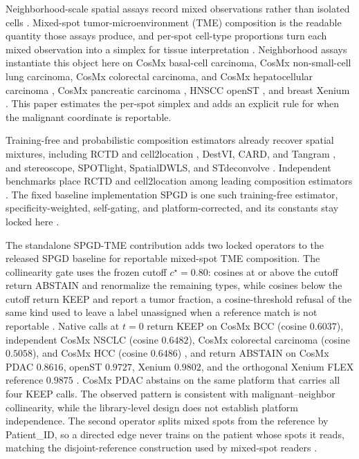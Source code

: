 Neighborhood-scale spatial assays record mixed observations rather than isolated cells \citep{Stahl2016,Moses2022,Rao2021}. Mixed-spot tumor-microenvironment (TME) composition is the readable quantity those assays produce, and per-spot cell-type proportions turn each mixed observation into a simplex for tissue interpretation \citep{Cable2022,Kleshchevnikov2022,Danaher2022,Miller2022,Newman2019,Elhanani2023}. Neighborhood assays instantiate this object here on CosMx basal-cell carcinoma, CosMx non-small-cell lung carcinoma, CosMx colorectal carcinoma, and CosMx hepatocellular carcinoma \citep{He2022,Andreatta2024zenodo,Crowell2025preprint,Sun2025spatial}, CosMx pancreatic carcinoma \citep{Pei2025}, HNSCC openST \citep{Schott2024}, and breast Xenium \citep{Janesick2023}. This paper estimates the per-spot simplex and adds an explicit rule for when the malignant coordinate is reportable.

Training-free and probabilistic composition estimators already recover spatial mixtures, including RCTD and cell2location \citep{Cable2022,Kleshchevnikov2022}, DestVI, CARD, and Tangram \citep{Lopez2022,Ma2022,Biancalani2021}, and stereoscope, SPOTlight, SpatialDWLS, and STdeconvolve \citep{Andersson2020,ElosuaBayes2021,Dong2021,Miller2022}. Independent benchmarks place RCTD and cell2location among leading composition estimators \citep{Li2022integrate,Sangaram2024}. The fixed baseline implementation SPGD is one such training-free estimator, specificity-weighted, self-gating, and platform-corrected, and its constants stay locked here \citep{Fu2026spgd}.

The standalone SPGD-TME contribution adds two locked operators to the released SPGD baseline \citep{Fu2026spgd} for reportable mixed-spot TME composition. The collinearity gate uses the frozen cutoff \(c^\star=0.80\): cosines at or above the cutoff return ABSTAIN and renormalize the remaining types, while cosines below the cutoff return KEEP and report a tumor fraction, a cosine-threshold refusal of the same kind used to leave a label unassigned when a reference match is not reportable \citep{Kiselev2018,deKanter2019}. Native calls at \(t=0\) return KEEP on CosMx BCC (cosine \(0.6037\)), independent CosMx NSCLC (cosine \(0.6482\)), CosMx colorectal carcinoma (cosine \(0.5058\)), and CosMx HCC (cosine \(0.6486\)) \citep{He2022,Andreatta2024zenodo,Crowell2025preprint,Sun2025spatial}, and return ABSTAIN on CosMx PDAC \(0.8616\), openST \(0.9727\), Xenium \(0.9802\), and the orthogonal Xenium FLEX reference \(0.9875\) \citep{Pei2025,Schott2024,Janesick2023}. CosMx PDAC abstains on the same platform that carries all four KEEP calls. The observed pattern is consistent with malignant--neighbor collinearity, while the library-level design does not establish platform independence. The second operator splits mixed spots from the reference by Patient\_ID, so a directed edge never trains on the patient whose spots it reads, matching the disjoint-reference construction used by mixed-spot readers \citep{Cable2022,Kleshchevnikov2022}.

